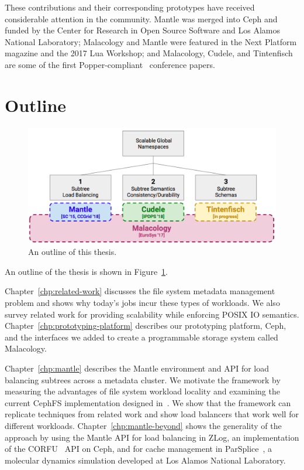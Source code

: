 These contributions and their corresponding prototypes have received
considerable attention in the community. Mantle was merged into Ceph and funded
by the Center for Research in Open Source Software and Los Alamos National
Laboratory; Malacology and Mantle were featured in the Next Platform magazine
and the 2017 Lua Workshop; and Malacology, Cudele, and Tintenfisch are some of
the first Popper-compliant~\cite{jimenez:ipdpsw17-popper} conference papers.

\section{Outline}

\begin{figure}[tb]
  \centering
  \includegraphics[width=1\textwidth]{./chapters/overview.png}
  \caption{An outline of this thesis.}
  \label{fig:thesis-overview}
\end{figure}

An outline of the thesis is shown in Figure~\ref{fig:thesis-overview}.

Chapter~\ref{chp:related-work} discusses the file system metadata management
problem and shows why today's jobs incur these types of workloads. We also
survey related work for providing scalability while enforcing POSIX IO
semantics. Chapter~\ref{chp:prototyping-platform} describes our prototyping
platform, Ceph, and the interfaces we added to create a programmable storage
system called Malacology.

Chapter~\ref{chp:mantle} describes the Mantle environment and API for load
balancing subtrees across a metadata cluster. We motivate the framework by
measuring the advantages of file system workload locality and examining the
current CephFS implementation designed in~\cite{weil:osdi2006-ceph,
weil:sc2004-dyn-metadata}. We show that the framework can replicate techniques
from related work and show load balancers that work well for different
workloads. Chapter~\ref{chp:mantle-beyond} shows the generality of the approach
by using the Mantle API for load balancing in ZLog, an implementation of the
CORFU~\cite{balakrishnan_corfu_2012} API on Ceph, and for cache management in
ParSplice~\cite{perez:jctc20150parsplice}, a molecular dynamics simulation
developed at Los Alamos National Laboratory.

